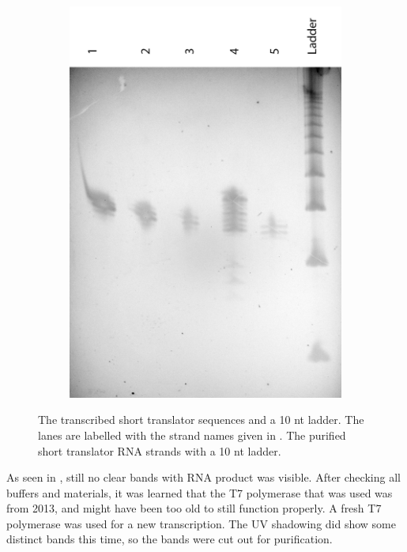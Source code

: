 \begin{figure}[h]
\begin{subfigure}[t]{.43\textwidth}
  \caption{}
  \label{translator_transcription_3}
\end{subfigure}
\begin{subfigure}[t]{.55\textwidth}
  \includegraphics[width=\textwidth]{images/translator_transcription_purified.png}
  \caption{}
  \label{translator_transcription_purified}
\end{subfigure}
\caption{ The transcribed short translator sequences and a 10 nt ladder. The lanes are labelled with the strand names given in .  The purified short translator RNA strands with a 10 nt ladder.}
\end{figure}

As seen in , still no clear bands with RNA product was visible. After checking all buffers and materials, it was learned that the T7 polymerase that was used was from 2013, and might have been too old to still function properly. A fresh T7 polymerase was used for a new transcription. The UV shadowing did show some distinct bands this time, so the bands were cut out for purification.


